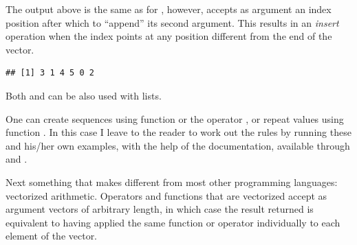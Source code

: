 \documentclass[krantz2]{krantz}\usepackage{knitr}%
\begin{document}
The output above is the same as for , however,  accepts as argument an index position after which to ``append'' its second argument. This results in an \emph{insert} operation when the index points at any position different from the end of the vector.

\begin{knitrout}\footnotesize
{}\color{fgcolor}\begin{kframe}
\begin{alltt}
    \hlstd{=} \hlstd{)}
\end{alltt}
\begin{verbatim}
## [1] 3 1 4 5 0 2
\end{verbatim}
\end{kframe}
\end{knitrout}

Both  and  can be also used with lists.

\begin{playground}
One can create sequences using function  or the operator \Roperator{:}, or repeat values using function . In this case I leave to the reader to work out the rules by running these and his/her own examples, with the help of the documentation, available through  and .

\begin{knitrout}\footnotesize
{}\color{fgcolor}\begin{kframe}
\begin{alltt}
 \hlkwb{<-} \hlopt{-}\hlopt{:}
 \hlkwb{<-} \hlopt{:-}
 \hlkwb{<-} \hlstd{(} \hlstd{=} \hlopt{-}\hlstd{,}  \hlstd{=} \hlstd{,}  \hlstd{=} \hlstd{)}
 \hlkwb{<-} \hlstd{(}\hlopt{-}\hlstd{,} \hlstd{)}
\end{alltt}
\end{kframe}
\end{knitrout}

\end{playground}

Next something that makes \Rlang different from most other programming languages: vectorized arithmetic. Operators and functions that are vectorized accept as argument vectors of arbitrary length, in which case the result returned is equivalent to having applied the same function or operator individually to each element of the vector.\label{par:vectorized:numeric}
\end{document}

